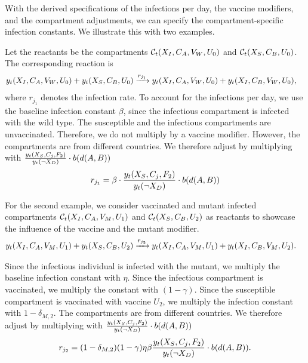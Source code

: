 With the derived specifications of the infections per day, the vaccine modifiers, and the compartment adjustments, we can specify the compartment-specific infection constants. We illustrate this with two examples. 

\begin{example}
Let the reactants be the compartments $\mathcal{C}_t(X_{I}, C_A, V_W, U_0)$ and $\mathcal{C}_t(X_{S}, C_B, U_0)$. The corresponding reaction is
\begin{align}
y_t(X_{I}, C_A, V_W, U_0) + y_t(X_{S}, C_B, U_0) &\xrightarrow{ r_{j_1}} y_t(X_{I}, C_A, V_W, U_0) + y_t(X_{I}, C_B, V_W, U_0),
\end{align}
where $r_{j_1}$ denotes the infection rate. To account for the infections per day, we use the baseline infection constant $\beta$, since the infectious compartment is infected with the wild type. The susceptible and the infectious compartments are unvaccinated. Therefore, we do not multiply by a vaccine modifier. However, the compartments are from different countries. We therefore adjust by multiplying with $\frac{y_t(X_S, C_j, F_2)}{y_t(\neg X_D)} \cdot b(d(A, B))$
\begin{align}
r_{j_1} = \beta \cdot \frac{y_t(X_S, C_j, F_2)}{y_t(\neg X_D)} \cdot b(d(A, B))
\end{align}
\end{example}

\begin{example}
For the second example, we consider vaccinated and mutant infected compartments $\mathcal{C}_t(X_{I}, C_A, V_M, U_1)$ and $\mathcal{C}_t(X_{S}, C_B, U_2)$ as reactants to showcase the influence of the vaccine and the mutant modifier. 
\begin{align}
y_t(X_{I}, C_A, V_M, U_1) + y_t(X_{S}, C_B, U_2) &\xrightarrow{ r_{j_2}} y_t(X_{I}, C_A, V_M, U_1) + y_t(X_{I}, C_B, V_M, U_2).
\end{align}

Since the infectious individual is infected with the mutant, we multiply the baseline infection constant with $\eta$. Since the infectious compartment is vaccinated, we multiply the constant with $(1-\gamma)$. Since the susceptible compartment is vaccinated with vaccine $U_2$, we multiply the infection constant with $1-\delta_{M,2}$. The compartments are from different countries. We therefore adjust by multiplying with $\frac{y_t(X_S, C_j, F_2)}{y_t(\neg X_D)} \cdot b(d(A, B))$
\begin{align}
r_{j_2} = (1-\delta_{M,2}) (1-\gamma) \eta \beta  \frac{y_t(X_S, C_j, F_2)}{y_t(\neg X_D)} \cdot b(d(A, B)).
\end{align}
\end{example}

